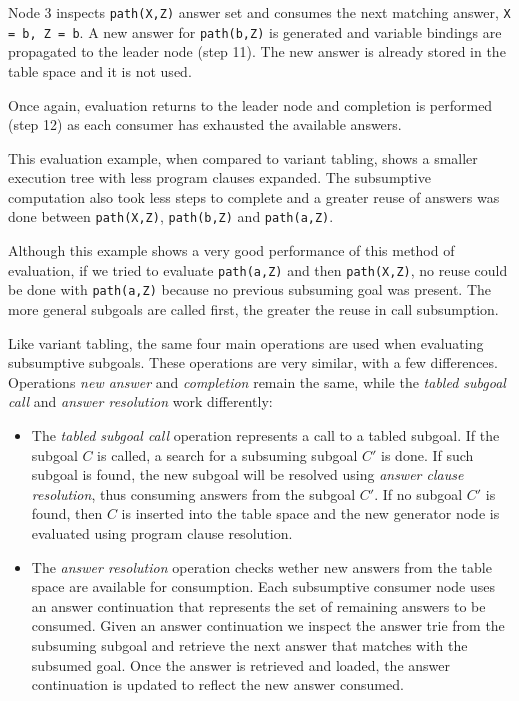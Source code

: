 Node 3 inspects \texttt{path(X,Z)} answer set and consumes the next matching answer, \texttt{X = b, Z = b}. A new answer
for \texttt{path(b,Z)} is generated and variable bindings are propagated to the leader node (step 11). The new answer is already
stored in the table space and it is not used.

Once again, evaluation returns to the leader node and completion is performed (step 12) as each consumer has exhausted the
available answers.

This evaluation example, when compared to variant tabling, shows a smaller execution tree with less
program clauses expanded. The subsumptive computation also took less steps to complete and a greater
reuse of answers was done between \texttt{path(X,Z)}, \texttt{path(b,Z)} and \texttt{path(a,Z)}.

Although this example shows a very good performance of this method of evaluation, if we tried
to evaluate \texttt{path(a,Z)} and then \texttt{path(X,Z)}, no reuse could be done with \texttt{path(a,Z)}
because no previous subsuming goal was present. The more general subgoals are called first, the greater
the reuse in call subsumption.

Like variant tabling, the same four main operations are used when evaluating subsumptive subgoals.
These operations are very similar, with a few differences. Operations \textit{new answer} and
\textit{completion} remain the same, while the \textit{tabled subgoal call} and \textit{answer resolution}
work differently:

\begin{itemize}
\item The \textit{tabled subgoal call} operation represents a call to a tabled subgoal.
If the subgoal $C$ is called, a search for a subsuming subgoal $C'$ is done. If such subgoal is found,
the new subgoal will be resolved using \textit{answer clause resolution}, thus consuming answers from the subgoal $C'$.
If no subgoal $C'$ is found, then $C$ is inserted into the table space and the new generator node is evaluated using
program clause resolution.

\item The \textit{answer resolution} operation checks wether new answers from the table space are available for consumption.
Each subsumptive consumer node uses an answer continuation that represents
the set of remaining answers to be consumed. Given an answer continuation we inspect the answer trie from the subsuming subgoal
and retrieve the next answer that matches with the subsumed goal. Once the answer is retrieved and loaded, the answer
continuation is updated to reflect the new answer consumed.
\end{itemize}

